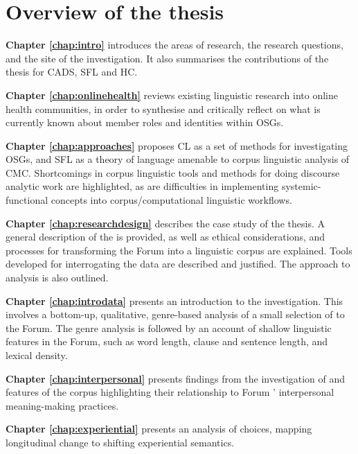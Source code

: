 \section{Overview of the thesis}

\noindent\textbf{Chapter \ref{chap:intro}} introduces the areas of research, the research questions, and the site of the investigation. It also summarises the contributions of the thesis for \gls{CADS}, \gls{SFL} and \gls{HC}.

\noindent\textbf{Chapter \ref{chap:onlinehealth}} reviews existing linguistic research into online health communities, in order to synthesise and critically reflect on what is currently known about member roles and identities within \glspl{OSG}.

\noindent\textbf{Chapter \ref{chap:approaches}} proposes \gls{CL} as a set of methods for investigating \glspl{OSG}, and \gls{SFL} as a theory of language amenable to corpus linguistic analysis of \gls{CMC}. Shortcomings in corpus linguistic tools and methods for doing discourse analytic work are highlighted, as are difficulties in implementing systemic\hyp{}functional concepts into corpus\slash computational linguistic workflows.

\noindent\textbf{Chapter \ref{chap:researchdesign}} describes the case study of the thesis. A general description of the  is provided, as well as ethical considerations, and processes for transforming the \gls{Forum} into a linguistic corpus are explained. Tools developed for interrogating the data are described and justified. The approach to analysis is also outlined.

\noindent\textbf{Chapter \ref{chap:introdata}} presents an introduction to the investigation. This involves a bottom\hyp{}up, qualitative, genre\hyp{}based analysis of a small selection of  to the \gls{Forum}. The genre analysis is followed by an account of shallow linguistic features in the \gls{Forum}, such as word length, clause and sentence length, and lexical density.

\noindent\textbf{Chapter \ref{chap:interpersonal}} presents findings from the investigation of  and  features of the \gls{corpus} highlighting their relationship to \gls{Forum} ' interpersonal meaning\hyp{}making practices.

\noindent\textbf{Chapter \ref{chap:experiential}} presents an analysis of  choices, mapping longitudinal change to shifting experiential semantics.

